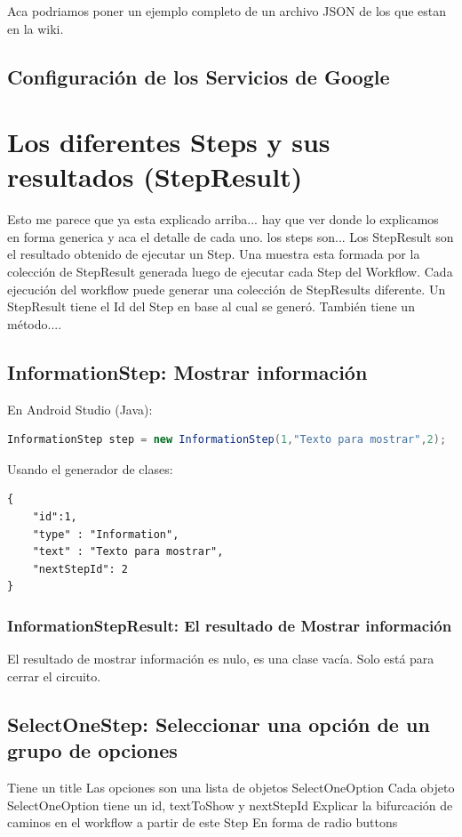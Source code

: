 Aca podriamos poner un ejemplo completo de un archivo JSON de los que estan en la wiki.

\subsection{Configuración de los Servicios de Google}

\section{Los diferentes Steps y sus resultados (StepResult)}
Esto me parece que ya esta explicado arriba... hay que ver donde lo explicamos en forma generica y aca el detalle de cada uno.
los steps son...
Los StepResult son el resultado obtenido de ejecutar un Step.
Una muestra esta formada por la colección de StepResult generada luego de ejecutar cada Step del Workflow. Cada ejecución del workflow puede generar una colección de StepResults diferente.
Un StepResult tiene el Id del Step en base al cual se generó. También tiene un método....

\subsection{InformationStep: Mostrar información}

En Android Studio (Java):
\begin{lstlisting}[language=Java, frame=tlb]	
InformationStep step = new InformationStep(1,"Texto para mostrar",2);
\end{lstlisting}

Usando el generador de clases:
\begin{lstlisting}[language=XML, frame=tlb]	
{
	"id":1,
	"type" : "Information",
	"text" : "Texto para mostrar",
	"nextStepId": 2
}
\end{lstlisting}

\subsubsection{InformationStepResult: El resultado de Mostrar información}
El resultado de mostrar información es nulo, es una clase vacía. Solo está para cerrar el circuito.

\subsection{SelectOneStep: Seleccionar una opción de un grupo de opciones}
Tiene un title
Las opciones son una lista de objetos SelectOneOption
Cada objeto SelectOneOption tiene un id, textToShow y nextStepId
Explicar la bifurcación de caminos en el workflow a partir de este Step
En forma de radio buttons

